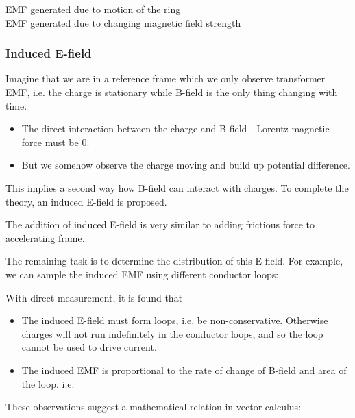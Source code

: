\documentclass[class=article, crop=false, 12pt]{standalone}
\begin{document}
EMF generated due to motion of the ring\\
EMF generated due to changing magnetic field strength\\

\subsubsection{Induced E-field}

Imagine that we are in a reference frame which we only observe transformer EMF,
i.e. the charge is stationary while B-field is the only thing changing with time.
\begin{itemize}
    \item The direct interaction between the charge and B-field 
    - Lorentz magnetic force must be $0$.
    \item But we somehow observe the charge moving and build up potential difference.
\end{itemize}

This implies a second way how B-field can interact with charges.
To complete the theory, an induced E-field is proposed.


The addition of induced E-field is very similar to adding frictious force to accelerating frame.


The remaining task is to determine the distribution of this E-field.
For example, we can sample the induced EMF using different conductor loops:


With direct measurement, it is found that
\begin{itemize}
    \item The induced E-field must form loops, 
    i.e. be non-conservative.
    Otherwise charges will not run indefinitely in the conductor loops,
    and so the loop cannot be used to drive current.

    \item The induced EMF is proportional to the rate of change of B-field 
    and area of the loop. i.e. 
\end{itemize}

These observations suggest a mathematical relation in vector calculus:
\end{document}
